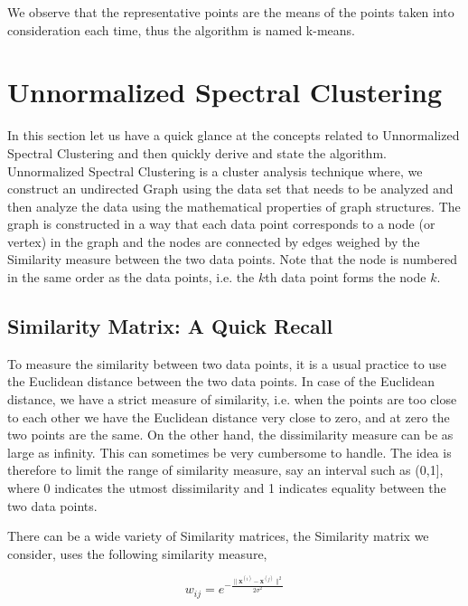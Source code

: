 \documentclass[english]{article}
\theoremstyle{plain}
\begin{document}
We observe that the representative points are the means of the points taken into consideration each time, thus the algorithm is named k-means.

\section{Unnormalized Spectral Clustering}

In this section let us have a quick glance at the concepts related to Unnormalized Spectral Clustering and then quickly derive and state the algorithm. Unnormalized Spectral Clustering is a cluster analysis technique where, we construct an undirected Graph using the data set that needs to be analyzed and then analyze the data using the mathematical properties of graph structures. The graph is constructed in a way that each data point corresponds to a node (or vertex) in the graph and the nodes are connected by edges weighed by the Similarity measure between the two data points. Note that the node is numbered in the same order as the data points, i.e. the $k$th data point forms the node $k$.

\subsection{Similarity Matrix: A Quick Recall}

To measure the similarity between two data points, it is a usual practice to use the Euclidean distance between the two data points. In case of the Euclidean distance, we have a strict measure of similarity, i.e. when the points are too close to each other we have the Euclidean distance very close to zero, and at zero the two points are the same. On the other hand, the dissimilarity measure can be as large as infinity. This can sometimes be very cumbersome to handle. The idea is therefore to limit the range of similarity measure, say an interval such as (0,1], where 0 indicates the utmost dissimilarity and 1 indicates equality between the two data points.

There can be a wide variety of Similarity matrices, the Similarity matrix we consider, uses the following similarity measure,

\begin{equation}
w_{ij} = e^{-\frac{\| \boldsymbol{x}^{(i)}-\boldsymbol{x}^{(j)} \|^2}{2 \sigma^2}}
\end{equation}
\end{document}
